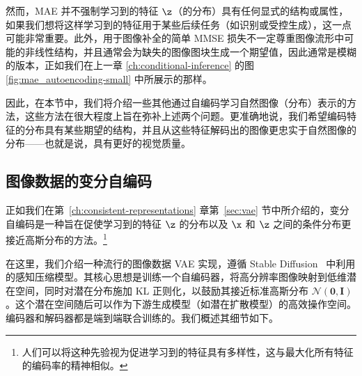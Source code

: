 \documentclass[../../book-main_zh.tex]{subfiles}
\begin{document}
然而，MAE 并不强制学习到的特征 $\z$（的分布）具有任何显式的结构或属性，如果我们想将这样学习到的特征用于某些后续任务（如识别或受控生成），这一点可能非常重要。此外，用于图像补全的简单 MMSE 损失不一定尊重图像流形中可能的非线性结构，并且通常会为缺失的图像图块生成一个期望值，因此通常是模糊的版本，正如我们在上一章 \ref{ch:conditional-inference} 的图 \ref{fig:mae_autoencoding-small} 中所展示的那样。

因此，在本节中，我们将介绍一些其他通过自编码学习自然图像（分布）表示的方法，这些方法在很大程度上旨在弥补上述两个问题。更准确地说，我们希望编码特征的分布具有某些期望的结构，并且从这些特征解码出的图像更忠实于自然图像的分布——也就是说，具有更好的视觉质量。 


\subsection{图像数据的变分自编码}





\label{sec:VAE-implement}


正如我们在第~\ref{ch:consistent-representations} 章第~\ref{sec:vae} 节中所介绍的，变分自编码是一种旨在促使学习到的特征 $\z$ 的分布以及 $\x$ 和 $\z$ 之间的条件分布更接近高斯分布的方法。\footnote{人们可以将这种先验视为促进学习到的特征具有多样性，这与最大化所有特征的编码率的精神相似。}

在这里，我们介绍一种流行的图像数据 VAE 实现，遵循 Stable Diffusion~\citep{rombach2022high} 中利用的感知压缩模型。其核心思想是训练一个自编码器，将高分辨率图像映射到低维潜在空间，同时对潜在分布施加 KL 正则化，以鼓励其接近标准高斯分布 $\mathcal{N}(\boldsymbol{0}, \boldsymbol{I})$。这个潜在空间随后可以作为下游生成模型（如潜在扩散模型）的高效操作空间。编码器和解码器都是端到端联合训练的。我们概述其细节如下。
\end{document}
